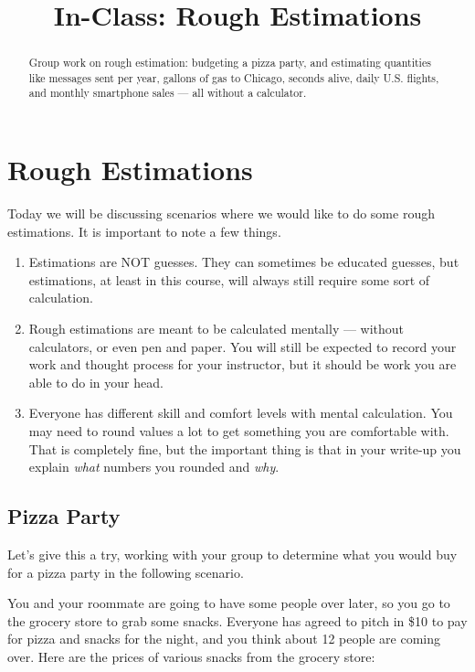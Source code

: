 \documentclass[12pt]{ximera}
\title{In-Class: Rough Estimations}
\begin{document}
\begin{abstract}
Group work on rough estimation: budgeting a pizza party, and estimating quantities
like messages sent per year, gallons of gas to Chicago, seconds alive, daily U.S.
flights, and monthly smartphone sales --- all without a calculator.
\end{abstract}
\maketitle

\section*{Rough Estimations}

Today we will be discussing scenarios where we would like to do some rough
estimations. It is important to note a few things.

\begin{enumerate}
\item Estimations are NOT guesses. They can sometimes be educated guesses, but
  estimations, at least in this course, will always still require some sort of
  calculation.
\item Rough estimations are meant to be calculated mentally --- without calculators,
  or even pen and paper. You will still be expected to record your work and thought
  process for your instructor, but it should be work you are able to do in your head.
\item Everyone has different skill and comfort levels with mental calculation. You
  may need to round values a lot to get something you are comfortable with. That is
  completely fine, but the important thing is that in your write-up you explain
  \emph{what} numbers you rounded and \emph{why}.
\end{enumerate}

\subsection*{Pizza Party}

Let's give this a try, working with your group to determine what you would buy for a
pizza party in the following scenario.

You and your roommate are going to have some people over later, so you go to the
grocery store to grab some snacks. Everyone has agreed to pitch in \$10 to pay for
pizza and snacks for the night, and you think about 12 people are coming over. Here
are the prices of various snacks from the grocery store:
\end{document}
